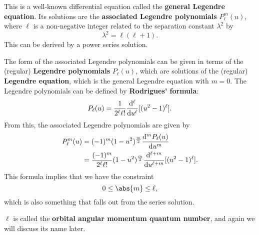 \documentclass[../quantum_mechanics.tex]{subfiles}
\begin{document}
            This is a well-known differential equation called the \textbf{general Legendre equation}.
            Its solutions are the \textbf{associated Legendre polynomials} $P_\ell^m(u)$, where $\ell$ is a non-negative integer related to the separation constant $\lambda^2$ by
            \begin{equation}
                \lambda^2=\ell(\ell+1).
            \end{equation}
            This can be derived by a power series solution.
            
            The form of the associated Legendre polynomials can be given in terms of the (regular) \textbf{Legendre polynomials} $P_\ell(u)$, which are solutions of the (regular) \textbf{Legendre equation}, which is the general Legendre equation with $m=0$.
            The Legendre polynomials can be defined by \textbf{Rodrigues' formula}:
            \begin{equation}
                P_\ell(u)=\frac{1}{2^\ell \ell!}\dv[\ell]{}{u}[(u^2-1)^\ell].
            \end{equation}
            From this, the associated Legendre polynomials are given by
            \begin{align}
                P_\ell^m(u)&=(-1)^m(1-u^2)^{\frac{m}{2}}\dv[m]{P_\ell(u)}{u}\\
                &=\frac{(-1)^m}{2^\ell \ell!}(1-u^2)^{\frac{m}{2}}\dv[\ell+m]{}{u}[(u^2-1)^\ell].
            \end{align}
            This formula implies that we have the constraint
            \begin{equation}
                0\leq\abs{m}\leq\ell,
            \end{equation}
            which is also something that falls out from the series solution.

            $\ell$ is called the \textbf{orbital angular momentum quantum number}, and again we will discuss its name later.
\end{document}
